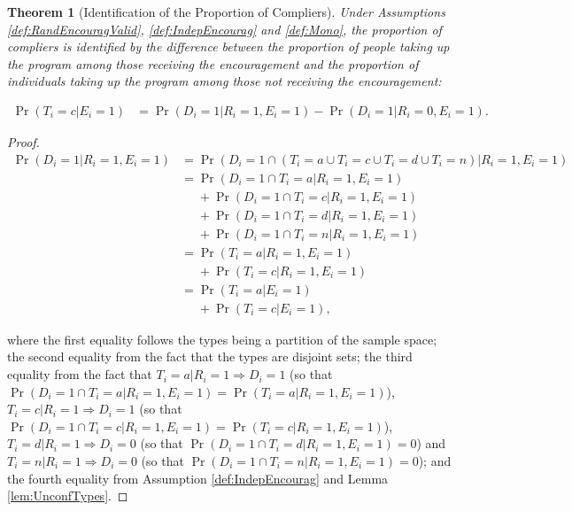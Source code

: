 \documentclass[
]{book}
\newtheorem{theorem}{Theorem}[chapter]
\theoremstyle{definition}
\theoremstyle{definition}
\theoremstyle{definition}
\theoremstyle{definition}
\theoremstyle{remark}
\begin{document}
\begin{theorem}[Identification of the Proportion of Compliers]
\protect\hypertarget{thm:prEncourag}{}{\label{thm:prEncourag} \iffalse (Identification of the Proportion of Compliers) \fi{} }Under Assumptions \ref{def:RandEncouragValid}, \ref{def:IndepEncourag} and \ref{def:Mono}, the proportion of compliers is identified by the difference between the proportion of people taking up the program among those receiving the encouragement and the proportion of individuals taking up the program among those not receiving the encouragement:

\begin{align*}
  \Pr(T_i=c|E_i=1) & = \Pr(D_i=1|R_i=1,E_i=1)-\Pr(D_i=1|R_i=0,E_i=1).
\end{align*}
\end{theorem}

\begin{proof}
\iffalse{} {Proof. } \fi{}\begin{align*}
 \Pr(D_i=1|R_i=1,E_i=1) & =\Pr(D_i=1\cap (T_i=a\cup T_i=c\cup T_i=d\cup T_i=n)|R_i=1,E_i=1) \\
                        & = \Pr(D_i=1\cap T_i=a|R_i=1,E_i=1)\\
                        & \phantom{=}+ \Pr(D_i=1\cap T_i=c|R_i=1,E_i=1)\\
                        & \phantom{=} +\Pr(D_i=1\cap T_i=d|R_i=1,E_i=1)\\
                        & \phantom{=} +\Pr(D_i=1\cap T_i=n|R_i=1,E_i=1)\\
                        & = \Pr(T_i=a|R_i=1,E_i=1)\\
                        & \phantom{=} +\Pr(T_i=c|R_i=1,E_i=1)\\
                        & = \Pr(T_i=a|E_i=1)\\
                        & \phantom{=} +\Pr(T_i=c|E_i=1),
\end{align*}

where the first equality follows the types being a partition of the sample space; the second equality from the fact that the types are disjoint sets; the third equality from the fact that \(T_i=a|R_i=1 \Rightarrow D_i=1\) (so that \(\Pr(D_i=1\cap T_i=a|R_i=1,E_i=1)=\Pr(T_i=a|R_i=1,E_i=1)\)), \(T_i=c|R_i=1 \Rightarrow D_i=1\) (so that \(\Pr(D_i=1\cap T_i=c|R_i=1,E_i=1)=\Pr(T_i=c|R_i=1,E_i=1)\)), \(T_i=d|R_i=1 \Rightarrow D_i=0\) (so that \(\Pr(D_i=1\cap T_i=d|R_i=1,E_i=1)=0\)) and \(T_i=n|R_i=1 \Rightarrow D_i=0\) (so that \(\Pr(D_i=1\cap T_i=n|R_i=1,E_i=1)=0\)); and the fourth equality from Assumption \ref{def:IndepEncourag} and Lemma \ref{lem:UnconfTypes}.
\end{proof}
\end{document}
